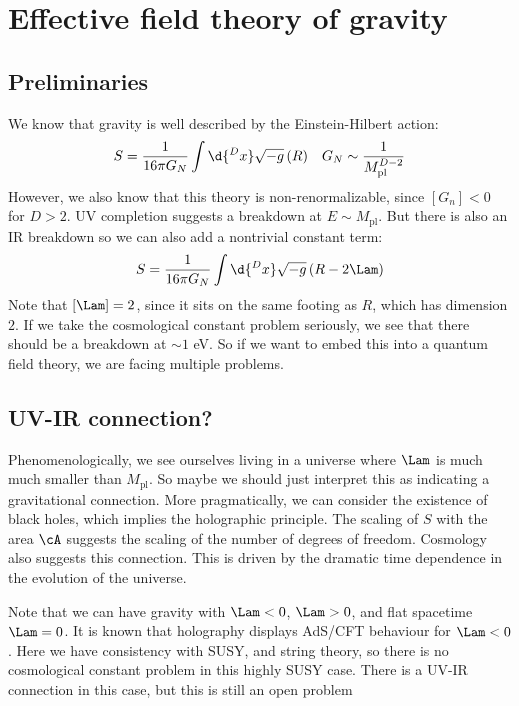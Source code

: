 \documentclass{booc}
\begin{document}
\chapter{Effective field theory of gravity}

\section{Preliminaries}

We know that gravity is well described by the Einstein-Hilbert action:
\begin{align}
S = \frac{1}{16 \pi G_N} \int  \d{^D x} \sqrt{-g} \left( R\right)
&&
G_N\sim \frac{1}{M_{\text{pl}}^{D-2}}
\end{align}
However, we also know that this theory is non-renormalizable, 
since $\left[ G_n\right] < 0$ for $D > 2$. 
UV completion suggests a breakdown at $E\sim M_{\text{pl}}$.
But there is also an IR breakdown 
so we can also add a nontrivial constant term:
\begin{equation}
S = \frac{1}{16 \pi G_N} \int  \d{^D x} \sqrt{-g} \left( R - 2\Lam \right)
\end{equation}
Note that $\left[ \Lam \right] = 2$, since it sits on the same footing as $R$, which has dimension $2$. 
If we take the cosmological constant problem seriously, we see that there should be a breakdown at 
$\sim 1$ eV. So if we want to embed this into a quantum field theory, 
we are facing multiple problems. 

\section{UV-IR connection?}

Phenomenologically, we see ourselves living in a universe where
$\Lam$ is much much smaller than $M_{\text{pl}}$. 
So maybe we should just interpret this as indicating a gravitational connection. 
More pragmatically, we can consider the existence of black holes, 
which implies the holographic principle.
The scaling of $S$ with the area $\cA$ 
suggests the scaling of the number of degrees of freedom.
Cosmology also suggests this connection. 
This is driven by the dramatic time dependence in the evolution of the universe. 

Note that we can have gravity with $\Lam < 0$, $\Lam > 0$, and flat spacetime 
$\Lam = 0$. 
It is known that holography displays AdS/CFT behaviour for $\Lam < 0$. 
Here we have consistency with SUSY, and string theory, so there is no 
cosmological constant problem in this highly SUSY case. 
There is a UV-IR connection in this case, but this is still an open problem 
\end{document}
